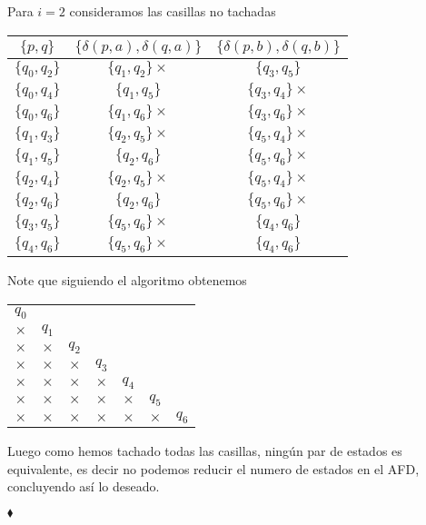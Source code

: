 Para $i=2$ consideramos las casillas no tachadas
            \begin{center}
                \begin{tabular}{c||c|c}
                  $\{p,q\}$ & $\{\delta(p,a),\delta(q,a)\}$ & $\{\delta(p,b),\delta(q,b)\}$\\ \hline
                  $\{q_0,q_2\}$ & $\{q_1,q_2\}\times$ & $\{q_3,q_5\}$ \\ \hline
                  $\{q_0,q_4\}$ & $\{q_1,q_5\}$ & $\{q_3,q_4\}\times$ \\ \hline
                  $\{q_0,q_6\}$ & $\{q_1,q_6\}\times$ & $\{q_3,q_6\}\times$ \\ \hline
                  $\{q_1,q_3\}$ & $\{q_2,q_5\}\times$ & $\{q_5,q_4\}\times$ \\ \hline
                  $\{q_1,q_5\}$ & $\{q_2,q_6\}$ & $\{q_5,q_6\}\times$ \\ \hline
                  $\{q_2,q_4\}$ & $\{q_2,q_5\}\times$ & $\{q_5,q_4\}\times$ \\ \hline
                  $\{q_2,q_6\}$ & $\{q_2,q_6\}$ & $\{q_5,q_6\}\times$ \\ \hline
                  $\{q_3,q_5\}$ & $\{q_5,q_6\}\times$ & $\{q_4,q_6\}$ \\ \hline
                  $\{q_4,q_6\}$ & $\{q_5,q_6\}\times$ & $\{q_4,q_6\}$ \\ \hline
                \end{tabular}
            \end{center}

Note que siguiendo el algoritmo obtenemos
\begin{center}
    \begin{tabular}{ccccccc}
    $q_0$ \\ \cline{1-1}
    \multicolumn{1}{|c|}{$\times$} & $q_1$ \\ \cline{1-2}
    \multicolumn{1}{|c|}{$\times$} & \multicolumn{1}{|c|}{$\times$} & $q_2$ \\ \cline{1-3}
    \multicolumn{1}{|c|}{$\times$} & \multicolumn{1}{|c|}{$\times$} & \multicolumn{1}{|c|}{$\times$} & $q_3$ \\ \cline{1-4}
    \multicolumn{1}{|c|}{$\times$} & \multicolumn{1}{|c|}{$\times$} & \multicolumn{1}{|c|}{$\times$} & \multicolumn{1}{|c|}{$\times$} & $q_4$ \\ \cline{1-5}
    \multicolumn{1}{|c|}{$\times$} & \multicolumn{1}{|c|}{$\times$} & \multicolumn{1}{|c|}{$\times$} & \multicolumn{1}{|c|}{$\times$} & \multicolumn{1}{|c|}{$\times$} & $q_5$ \\ \cline{1-6}
    \multicolumn{1}{|c|}{$\times$} & \multicolumn{1}{|c|}{$\times$} & \multicolumn{1}{|c|}{$\times$} & \multicolumn{1}{|c|}{$\times$} & \multicolumn{1}{|c|}{$\times$} & \multicolumn{1}{|c|}{$\times$} & $q_6$ \\ \cline{1-6}
    \end{tabular}
\end{center}
Luego como hemos tachado todas las casillas, ningún par de estados es equivalente, es decir no podemos reducir el numero de estados en el AFD, concluyendo así lo deseado.

\hfill$\blacklozenge$

